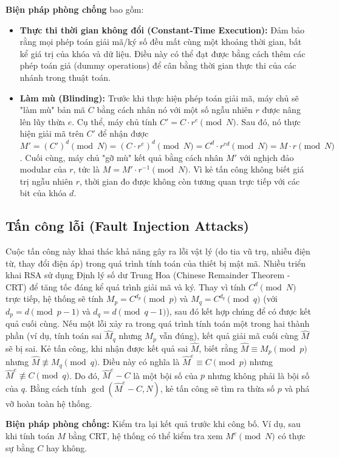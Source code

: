 \documentclass[12pt, a4paper]{article}
\begin{document}
\textbf{Biện pháp phòng chống} bao gồm:
\begin{itemize}
    \item \textbf{Thực thi thời gian không đổi (Constant-Time Execution):} Đảm bảo rằng mọi phép toán giải mã/ký số đều mất cùng một khoảng thời gian, bất kể giá trị của khóa và dữ liệu. Điều này có thể đạt được bằng cách thêm các phép toán giả (dummy operations) để cân bằng thời gian thực thi của các nhánh trong thuật toán.
    \item \textbf{Làm mù (Blinding):} Trước khi thực hiện phép toán giải mã, máy chủ sẽ "làm mù" bản mã $C$ bằng cách nhân nó với một số ngẫu nhiên $r$ được nâng lên lũy thừa $e$. Cụ thể, máy chủ tính $C' = C \cdot r^e \pmod{N}$. Sau đó, nó thực hiện giải mã trên $C'$ để nhận được $M' = (C')^d \pmod{N} = (C \cdot r^e)^d \pmod{N} = C^d \cdot r^{ed} \pmod{N} = M \cdot r \pmod{N}$. Cuối cùng, máy chủ "gỡ mù" kết quả bằng cách nhân $M'$ với nghịch đảo modular của $r$, tức là $M = M' \cdot r^{-1} \pmod{N}$. Vì kẻ tấn công không biết giá trị ngẫu nhiên $r$, thời gian đo được không còn tương quan trực tiếp với các bit của khóa $d$.
\end{itemize}

\subsection{Tấn công lỗi (Fault Injection Attacks)}
Cuộc tấn công này khai thác khả năng gây ra lỗi vật lý (do tia vũ trụ, nhiễu điện từ, thay đổi điện áp) trong quá trình tính toán của thiết bị mật mã. Nhiều triển khai RSA sử dụng Định lý số dư Trung Hoa (Chinese Remainder Theorem - CRT) để tăng tốc đáng kể quá trình giải mã và ký. Thay vì tính $C^d \pmod{N}$ trực tiếp, hệ thống sẽ tính $M_p = C^{d_p} \pmod{p}$ và $M_q = C^{d_q} \pmod{q}$ (với $d_p = d \pmod{p-1}$ và $d_q = d \pmod{q-1}$), sau đó kết hợp chúng để có được kết quả cuối cùng. Nếu một lỗi xảy ra trong quá trình tính toán một trong hai thành phần (ví dụ, tính toán sai $\hat{M}_q$ nhưng $M_p$ vẫn đúng), kết quả giải mã cuối cùng $\hat{M}$ sẽ bị sai. Kẻ tấn công, khi nhận được kết quả sai $\hat{M}$, biết rằng $\hat{M} \equiv M_p \pmod{p}$ nhưng $\hat{M} \not\equiv M_q \pmod{q}$. Điều này có nghĩa là $\hat{M}^e \equiv C \pmod{p}$ nhưng $\hat{M}^e \not\equiv C \pmod{q}$. Do đó, $\hat{M}^e - C$ là một bội số của $p$ nhưng không phải là bội số của $q$. Bằng cách tính $\gcd(\hat{M}^e - C, N)$, kẻ tấn công sẽ tìm ra thừa số $p$ và phá vỡ hoàn toàn hệ thống.

\textbf{Biện pháp phòng chống:} Kiểm tra lại kết quả trước khi công bố. Ví dụ, sau khi tính toán $M$ bằng CRT, hệ thống có thể kiểm tra xem $M^e \pmod{N}$ có thực sự bằng $C$ hay không.
\end{document}
